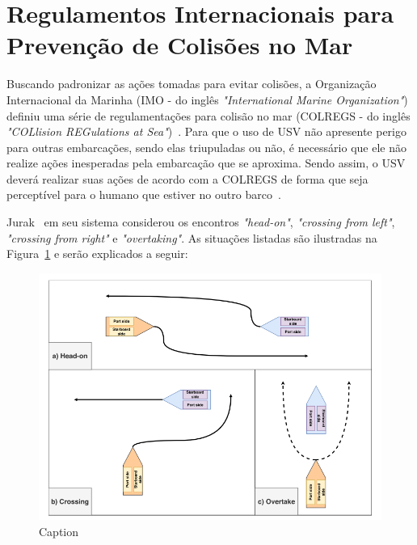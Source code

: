     \section{Regulamentos Internacionais para Prevenção de Colisões no Mar}\label{subchap2:colregs}
        Buscando padronizar as ações tomadas para evitar colisões, a Organização Internacional da Marinha (IMO - do inglês \textit{"International Marine Organization"}) definiu uma série de regulamentações para colisão no mar (COLREGS - do inglês \textit{"COLlision REGulations at Sea"})~\cite{COLREGS}.
        Para que o uso de USV não apresente perigo para outras embarcações, sendo elas triupuladas ou não, é necessário que ele não realize ações inesperadas pela embarcação que se aproxima. Sendo assim, o USV deverá realizar suas ações de acordo com a COLREGS de forma que seja perceptível para o humano que estiver no outro barco~\cite{KUWATA2014110}.
        
        Jurak~\cite{JURAK2020} em seu sistema considerou os encontros \textit{"head-on"}, \textit{"crossing from left"}, \textit{"crossing from right"} e \textit{"overtaking"}. As situações listadas são ilustradas na Figura~\ref{fig:Jurak2020_colregsSituations} e serão explicados a seguir: 
        
        \begin{figure}
            \centering
            \includegraphics[width=\textwidth]{fig/chap2/colregs_situations.png}
            \caption{Caption}
            \label{fig:Jurak2020_colregsSituations}
        \end{figure}
        
